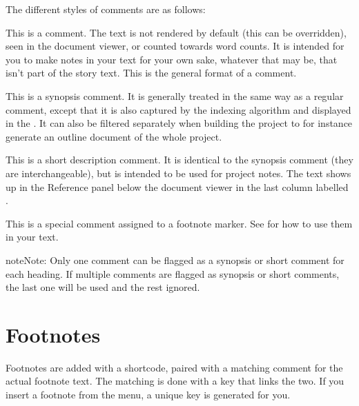 \documentclass[a4paper,11pt,english]{sphinxmanual}
\begin{document}
\sphinxAtStartPar
The different styles of comments are as follows:
\begin{description}
\sphinxAtStartPar
This is a comment. The text is not rendered by default (this can be overridden), seen in the
document viewer, or counted towards word counts. It is intended for you to make notes in your
text for your own sake, whatever that may be, that isn’t part of the story text. This is the
general format of a comment.

\sphinxAtStartPar
This is a synopsis comment. It is generally treated in the same way as a regular comment, except
that it is also captured by the indexing algorithm and displayed in the {\hyperref[\detokenize{usage_project:a-ui-outline}]{}}. It
can also be filtered separately when building the project to for instance generate an outline
document of the whole project.

\sphinxAtStartPar
This is a short description comment. It is identical to the synopsis comment (they are
interchangeable), but is intended to be used for project notes. The text shows up in the
Reference panel below the document viewer in the last column labelled .

\sphinxAtStartPar
This is a special comment assigned to a footnote marker. See {\hyperref[\detokenize{usage_format:a-fmt-footnote}]{}} for how to
use them in your text.

\end{description}

\begin{sphinxadmonition}{note}{Note:}
\sphinxAtStartPar
Only one comment can be flagged as a synopsis or short comment for each heading. If multiple
comments are flagged as synopsis or short comments, the last one will be used and the rest
ignored.
\end{sphinxadmonition}


\section{Footnotes}
\label{\detokenize{usage_format:footnotes}}\label{\detokenize{usage_format:a-fmt-footnote}}
\sphinxAtStartPar
Footnotes are added with a shortcode, paired with a matching comment for the actual footnote text.
The matching is done with a key that links the two. If you insert a footnote from the 
menu, a unique key is generated for you.
\end{document}
